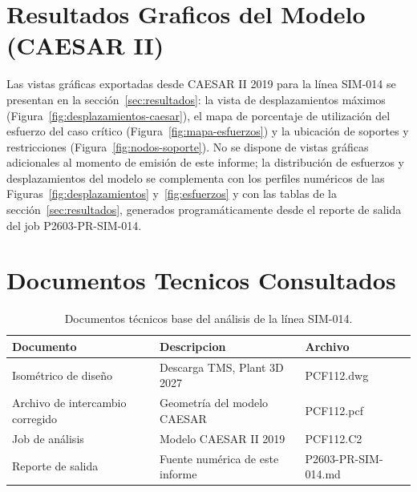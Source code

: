 \appendix
\section{Resultados Graficos del Modelo (CAESAR II)}
\label{appendix:graficos}

Las vistas gr\'{a}ficas exportadas desde CAESAR II 2019 para la l\'{i}nea
SIM-014 se presentan en la secci\'{o}n~\ref{sec:resultados}: la vista de
desplazamientos m\'{a}ximos (Figura~\ref{fig:desplazamientos-caesar}), el mapa
de porcentaje de utilizaci\'{o}n del esfuerzo del caso cr\'{i}tico
(Figura~\ref{fig:mapa-esfuerzos}) y la ubicaci\'{o}n de soportes y
restricciones (Figura~\ref{fig:nodos-soporte}). No se dispone de vistas
gr\'{a}ficas adicionales al momento de emisi\'{o}n de este informe; la
distribuci\'{o}n de esfuerzos y desplazamientos del modelo se complementa con
los perfiles num\'{e}ricos de las Figuras~\ref{fig:desplazamientos}
y~\ref{fig:esfuerzos} y con las tablas de la
secci\'{o}n~\ref{sec:resultados}, generados program\'{a}ticamente desde el
reporte de salida del job P2603-PR-SIM-014.

\section{Documentos Tecnicos Consultados}
\label{appendix:documentos}

\begin{table}[htbp]
    \centering
    \small
    \caption{Documentos t\'{e}cnicos base del an\'{a}lisis de la l\'{i}nea SIM-014.}
    \label{tab:planos}
    \begin{tabular}{@{}lll@{}}
        \toprule
        \textbf{Documento} & \textbf{Descripcion} & \textbf{Archivo} \\
        \midrule
        Isom\'{e}trico de dise\~{n}o & Descarga TMS, Plant 3D 2027 & PCF112.dwg \\
        Archivo de intercambio corregido & Geometr\'{i}a del modelo CAESAR & PCF112.pcf \\
        Job de an\'{a}lisis & Modelo CAESAR II 2019 & PCF112.C2 \\
        Reporte de salida & Fuente num\'{e}rica de este informe & P2603-PR-SIM-014.md \\
        \bottomrule
    \end{tabular}
\end{table}
